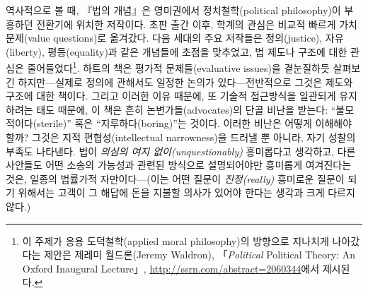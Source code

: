 \documentclass[12pt, oneside]{book}  %
\begin{document}
역사적으로 볼 때, 『법의 개념』은 영미권에서 정치철학(political
philosophy)이 부흥하던 전환기에 위치한 저작이다. 초판 출간 이후, 학계의
관심은 비교적 빠르게 가치 문제(value questions)로 옮겨갔다. 다음 세대의
주요 저작들은 정의(justice), 자유(liberty), 평등(equality)과 같은
개념들에 초점을 맞추었고, 법 제도나 구조에 대한 관심은
줄어들었다\footnote{이 주제가 응용 도덕철학(applied moral philosophy)의
  방향으로 지나치게 나아갔다는 제안은 제레미 월드론(Jeremy Waldron),
  「\emph{Political} Political Theory: An Oxford Inaugural Lecture」,
  \url{http://ssrn.com/abstract=2060344}에서 제시된다.}. 하트의 책은
평가적 문제들(evaluative issues)을 곁눈질하듯 살펴보긴 하지만---실제로
정의에 관해서도 일정한 논의가 있다---전반적으로 그것은 제도와 구조에
대한 책이다. 그리고 이러한 이유 때문에, 또 기술적 접근방식을 일관되게
유지하려는 태도 때문에, 이 책은 흔히 논변가들(advocates)의 단골 비난을
받는다: ``불모적이다(sterile)'' 혹은 ``지루하다(boring)''는 것이다.
이러한 비난은 어떻게 이해해야 할까? 그것은 지적 편협성(intellectual
narrowness)을 드러낼 뿐 아니라, 자기 성찰의 부족도 나타낸다. 법이
\emph{의심의 여지 없이(unquestionably)} 흥미롭다고 생각하고, 다른
사안들도 어떤 소송의 가능성과 관련된 방식으로 설명되어야만 흥미롭게
여겨진다는 것은, 일종의 법률가적 자만이다---(이는 어떤 질문이
\emph{진정(really)} 흥미로운 질문이 되기 위해서는 고객이 그 해답에 돈을
지불할 의사가 있어야 한다는 생각과 크게 다르지 않다.)
\end{document}
